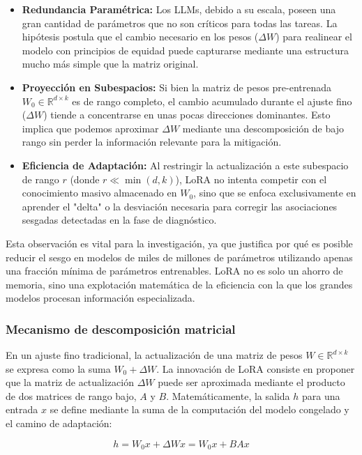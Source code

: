 \documentclass[12pt,a4paper]{report}
\begin{document}
\begin{itemize}
    \item \textbf{Redundancia Paramétrica:} Los LLMs, debido a su escala, poseen una gran cantidad de parámetros que no son críticos para todas las tareas. La hipótesis postula que el cambio necesario en los pesos ($\Delta W$) para realinear el modelo con principios de equidad puede capturarse mediante una estructura mucho más simple que la matriz original.
    \item \textbf{Proyección en Subespacios:} Si bien la matriz de pesos pre-entrenada $W_0 \in \mathbb{R}^{d \times k}$ es de rango completo, el cambio acumulado durante el ajuste fino ($\Delta W$) tiende a concentrarse en unas pocas direcciones dominantes. Esto implica que podemos aproximar $\Delta W$ mediante una descomposición de bajo rango sin perder la información relevante para la mitigación.
    \item \textbf{Eficiencia de Adaptación:} Al restringir la actualización a este subespacio de rango $r$ (donde $r \ll \min(d, k)$), LoRA no intenta competir con el conocimiento masivo almacenado en $W_0$, sino que se enfoca exclusivamente en aprender el "delta" o la desviación necesaria para corregir las asociaciones sesgadas detectadas en la fase de diagnóstico.
\end{itemize}

Esta observación es vital para la investigación, ya que justifica por qué es posible reducir el sesgo en modelos de miles de millones de parámetros utilizando apenas una fracción mínima 
de parámetros entrenables. LoRA no es solo un ahorro de memoria, sino una explotación matemática de la eficiencia con la que los grandes modelos procesan información especializada.

\subsubsection{Mecanismo de descomposición matricial}
\label{par:fundamentacion_lora}

En un ajuste fino tradicional, la actualización de una matriz de pesos $W \in \mathbb{R}^{d \times k}$ se expresa como la suma $W_0 + \Delta W$. La innovación de LoRA consiste en proponer que la matriz de actualización $\Delta W$ puede ser aproximada mediante el producto de dos matrices de rango bajo, $A$ y $B$. Matemáticamente, la salida $h$ para una entrada $x$ se define mediante la suma de la computación del modelo congelado y el camino de adaptación:

\begin{equation}
h = W_0 x + \Delta W x = W_0 x + B A x
\end{equation}
\end{document}
